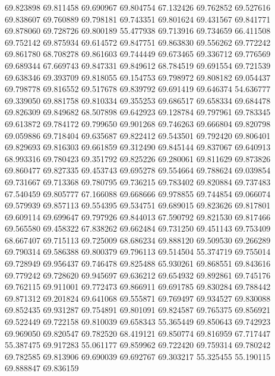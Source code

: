 69.823898
69.811458
69.690967
69.804754
67.132426
69.762852
69.527616
69.838607
69.760889
69.798181
69.743351
69.801624
69.431567
69.841771
69.878060
69.728726
69.800189
55.477938
69.713916
69.734659
66.411508
69.752142
69.875934
69.614572
69.847751
69.863830
69.556262
69.772242
69.861780
68.708278
69.861603
69.744449
69.673465
69.336712
69.776569
69.689344
67.669743
69.847331
69.849612
68.784519
69.691554
69.721539
69.638346
69.393709
69.818055
69.154753
69.798972
69.808182
69.054437
69.798778
69.816552
69.517678
69.839792
69.691419
69.646374
54.636777
69.339050
69.881758
69.810334
69.355253
69.686517
69.658334
69.684478
69.826309
69.849682
68.507898
69.642923
69.128784
69.797961
69.783345
69.613872
69.784172
69.799650
69.901268
69.746263
69.666804
69.820798
69.059886
69.718404
69.635687
69.822412
69.543501
69.792420
69.806401
69.829693
69.816303
69.661859
69.312490
69.845144
69.837067
69.640913
68.993316
69.780423
69.351792
69.825226
69.280061
69.811629
69.873826
69.860477
69.827335
69.453743
69.695278
69.554664
69.788624
69.039854
69.731667
69.713368
69.780795
69.736215
69.783402
69.820884
69.737483
67.540459
69.805777
67.166088
69.668666
69.978855
69.744854
69.066074
69.579939
69.857113
69.554395
69.534751
69.689015
69.823626
69.817801
69.609114
69.699647
69.797926
69.844013
67.590792
69.821530
69.817466
69.565580
69.458322
67.838262
69.662484
69.731250
69.451143
69.753409
68.667407
69.715113
69.725009
68.686234
69.888120
69.509530
69.266289
69.790314
69.586388
69.800379
69.796113
69.514504
55.374719
69.755014
69.728949
69.956437
69.746478
69.825488
65.930261
69.868551
69.843616
69.779242
69.728620
69.945697
69.636212
69.654932
69.892861
69.745176
69.762115
69.911001
69.772473
69.866911
69.691785
69.830284
69.788442
69.871312
69.201824
69.641068
69.555871
69.769497
69.934527
69.830088
69.852435
69.931287
69.754891
69.801091
69.824587
69.765375
69.856921
69.522449
69.722158
69.810039
69.658343
55.365449
69.850643
69.742923
69.969050
69.820547
69.782520
68.419121
69.850774
69.816959
67.717447
55.387475
69.917283
55.061177
69.859962
69.722420
69.759314
69.780242
69.782585
69.813906
69.690039
69.692767
69.303217
55.325455
55.190115
69.888847
69.836159
